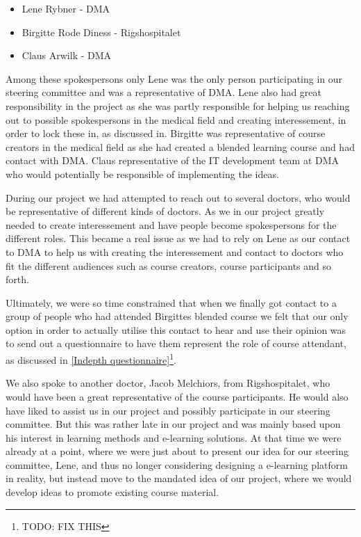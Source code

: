 \begin{itemize}
\item Lene Rybner - DMA
\item Birgitte Rode Diness - Rigshospitalet
\item Claus Arwilk - DMA
\end{itemize}


Among these spokespersons only Lene was the only person participating in our steering committee and was a representative of DMA. Lene also had great responsibility in the project as she was partly responsible for helping us reaching out to possible spokespersons in the medical field and creating interessement, in order to lock these in, as discussed in\cite{callon}. Birgitte was representative of course creators in the medical field as she had created a blended learning course and had contact with DMA. Claus representative of the IT development team at DMA who would potentially be responsible of implementing the ideas.

During our project we had attempted to reach out to several doctors, who would be representative of different kinds of doctors. As we in our project greatly needed to create interessement and have people become spokespersons for the different roles. This became a real issue as we had to rely on Lene as our contact to DMA to help us with creating the interessement and contact to doctors who fit the different audiences such as course creators, course participants and so forth.

Ultimately, we were so time constrained that when we finally got contact to a group of people who had attended Birgittes blended course we felt that our only option in order to actually utilise this contact to hear and use their opinion was to send out a questionnaire to have them represent the role of course attendant, as discussed in \ref{Indepth questionnaire}\footnote{TODO: FIX THIS}. 

We also spoke to another doctor, Jacob Melchiors, from Rigshospitalet, who would have been a great representative of the course participants. He would also have liked to assist us in our project and possibly participate in our steering committee. But this was rather late in our project and was mainly based upon his interest in learning methods and e-learning solutions. At that time we were already at a point, where we were just about to present our idea for our steering committee, Lene, and thus no longer considering designing a e-learning platform in reality, but instead move to the mandated idea of our project, where we would develop ideas to promote existing course material.

